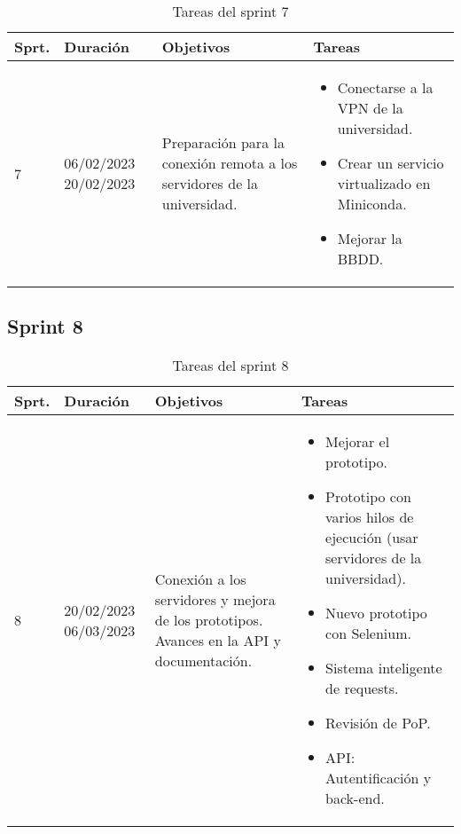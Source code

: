 \begin{table}[h]
\centering
\begin{tabularx}{\textwidth}{llll}
\toprule
\textbf{Sprt.} & \textbf{Duración} & \textbf{Objetivos} & \textbf{Tareas}\\
\midrule
    7 & \parbox{55}{06/02/2023 20/02/2023} & \parbox{80}{Preparación para la conexión remota a los servidores de la universidad.} & \parbox{150}{\begin{itemize}\item Conectarse a la VPN de la universidad. \item Crear un servicio virtualizado en Miniconda. \item Mejorar la BBDD.\end{itemize}}\\
\bottomrule
\end{tabularx}
\caption{Tareas del sprint 7}
\label{tab:sprint7}
\end{table}


\subsection{Sprint 8}
\begin{table}[h]
\centering
\begin{tabularx}{\textwidth}{llll}
\toprule
\textbf{Sprt.} & \textbf{Duración} & \textbf{Objetivos} & \textbf{Tareas}\\
\midrule
    8 & \parbox{55}{20/02/2023 06/03/2023} & \parbox{80}{Conexión a los servidores y mejora de los prototipos. Avances en la API y documentación.} & \parbox{150}{\begin{itemize}\item Mejorar el prototipo. \item Prototipo con varios hilos de ejecución (usar servidores de la universidad). \item Nuevo prototipo con Selenium. \item Sistema inteligente de requests. \item Revisión de PoP. \item API: Autentificación y back-end.\end{itemize}}\\
\bottomrule
\end{tabularx}
\caption{Tareas del sprint 8}
\label{tab:sprint8}
\end{table}


